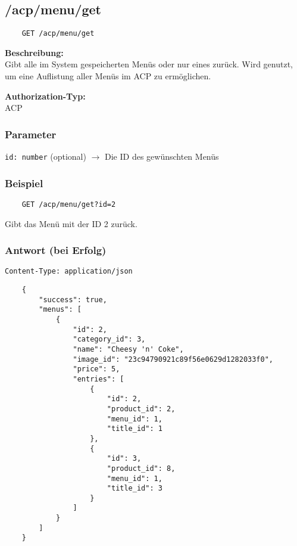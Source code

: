 \subsection{/acp/menu/get}

\begin{lstlisting}
    GET /acp/menu/get
\end{lstlisting}

\textbf{Beschreibung:} \\
Gibt alle im System gespeicherten Menüs oder nur eines zurück. Wird genutzt, um eine Auflistung aller Menüs im ACP zu ermöglichen.

\textbf{Authorization-Typ:} \\
ACP

\subsubsection{Parameter}

\lstinline{id: number} (optional)
$\rightarrow$ Die ID des gewünschten Menüs

\subsubsection{Beispiel}

\begin{lstlisting}
    GET /acp/menu/get?id=2
\end{lstlisting}

Gibt das Menü mit der ID 2 zurück.

\subsubsection{Antwort (bei Erfolg)}

\lstinline{Content-Type: application/json}
\begin{lstlisting}
    {
        "success": true, 
        "menus": [
            {
                "id": 2,
                "category_id": 3,
                "name": "Cheesy 'n' Coke",
                "image_id": "23c94790921c89f56e0629d1282033f0",
                "price": 5,
                "entries": [
                    {
                        "id": 2,
                        "product_id": 2,
                        "menu_id": 1,
                        "title_id": 1
                    },
                    {
                        "id": 3,
                        "product_id": 8,
                        "menu_id": 1,
                        "title_id": 3
                    }
                ]
            }
        ]
    }
\end{lstlisting}
